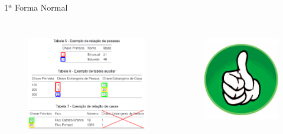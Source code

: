 \documentclass{beamer} %
\begin{document}
\begin{frame}{1ª Forma Normal}
\begin{columns}
    
    \begin{figure}
        \centering
        \includegraphics[width=\linewidth]{imagens/1-forma-normal-certo.png}
        \label{fig:1-forma-normal-certo}
    \end{figure}
    
    
    \begin{figure}
        \centering
        \includegraphics[width=\linewidth]{imagens/certo.png}
        \label{fig:1f-certo}
    \end{figure}
\end{columns}
\end{frame}
\end{document}
